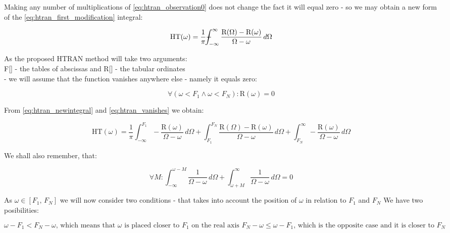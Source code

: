 \documentclass[12pt,twoside,a4paper]{article}
\numberwithin{equation}{subsection}
\numberwithin{figure}{subsection}
\def\Xint#1{\mathchoice
{\XXint\displaystyle\textstyle{#1}}%
{\XXint\textstyle\scriptstyle{#1}}%
{\XXint\scriptstyle\scriptscriptstyle{#1}}%
{\XXint\scriptscriptstyle\scriptscriptstyle{#1}}%
\!\int}
\def\XXint#1#2#3{{\setbox0=\hbox{$#1{#2#3}{\int}$ }\vcenter{\hbox{$#2#3$ }}\kern-.6\wd0}}
\def\dashint{\Xint-}
\begin{document}
Making any number of multiplications of \ref{eq:htran_observation0} does not change the fact it will equal zero - so we may obtain
a new form of the \ref{eq:htran_first_modification} integral:

\begin{equation} \label{eq:htran_newintegral}
  \mathrm{HT}(\omega )=\frac {1}{\pi }\dashint_{ - \infty }^{\infty }\frac {\mathrm{R}(\Omega ) - \mathrm{R}(\omega )}{\Omega -
  \omega }\,d\Omega 
\end{equation}


As the proposed HTRAN method will take two arguments: \\
F[] - the tables of abscissas and R[] - the tabular ordinates \\
- we will assume that the function vanishes anywhere else - namely it equals zero:

\begin{equation} \label{eq:htran_vanishes}
  \forall ( \omega < F_{1} \wedge \omega < F_{N} ) : \mathrm{R}(\omega )=0  
\end{equation}

From \ref{eq:htran_newintegral} and \ref{eq:htran_vanishes} we obtain:

\begin{equation} \label{eq:htran_ht}
  \mathrm{HT}(\omega )=\frac {1}{\pi } \int_{ - \infty }^{{F_{1}}} - \frac {\mathrm{R}(\omega )}{\Omega  - \omega }\,d\Omega  +
  \int_{{F_{1}}}^{{F_{N}}}\frac {\mathrm{R}(\Omega ) - \mathrm{R}(\omega )}{\Omega  - \omega }\,d\Omega  + \int_{{F_{N}}}^{\infty }
  - \frac {\mathrm{R}(\omega )}{\Omega  - \omega }\,d\Omega 
\end{equation}

We shall also remember, that:

\begin{equation} \label{eq:htran_forallm}
  \forall M : \int_{ - \infty }^{\omega  - M}\frac {1}{\Omega  - \omega }\,d\Omega  + \int_{\omega + M}^{\infty }\frac {1}{\Omega 
  - \omega }\,d\Omega =0
\end{equation}

As $\omega  \in [{F_{1}}, \,{F_{N}}]$  we will now consider two conditions - that takes into account the position of  $\omega $ in
relation to ${F_{1}}$  and ${F_{N}}$ We have two posibilities:

\begin{subequations} \label{eq:htran_twoposibilities}
  \begin{equation}   \label{eq:htposs_closer}
    \omega - F_{1} < F_{N} - \omega \mbox{, which means that $\omega$ is placed closer to $F_{1}$ on the real axis }
  \end{equation}
  \begin{equation}   \label{eq:htposs_opposite}
    {F_{N}} - \omega \leq \omega  - {F_{1}} \mbox {, which is the opposite case and it is closer to ${F_{N}}$}
  \end{equation}
\end{subequations}
\end{document}
